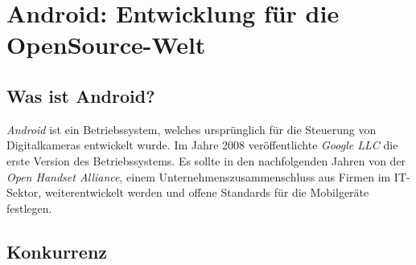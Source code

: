 \section{Android: Entwicklung für die OpenSource-Welt}
\label{android}

\subsection{Was ist Android?}
\textit{Android} ist ein Betriebssystem, welches ursprünglich für die Steuerung von Digitalkameras
entwickelt wurde. Im Jahre 2008 veröffentlichte \textit{Google LLC} die erste Version des
Betriebssystems. Es sollte in den nachfolgenden Jahren von der \textit{Open Handset Alliance}, einem
Unternehmenszusammenschluss aus Firmen im IT-Sektor, weiterentwickelt werden und offene
Standards für die Mobilgeräte festlegen.

\subsection{Konkurrenz}
